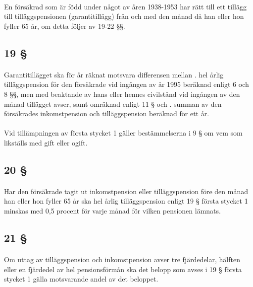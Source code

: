\documentclass[a4paper,notitlepage,openany,10pt]{book}
\begin{document}
\paragraph*{}
En försäkrad som är född under något av åren 1938-1953 har rätt till ett tillägg till tilläggspensionen (garantitillägg) från och med den månad då han eller hon fyller 65 år, om detta följer av 19-22 §§.
\subsection*{19 §}
\paragraph*{}
Garantitillägget ska för år räknat motsvara differensen mellan
. hel årlig tilläggspension för den försäkrade vid ingången av år 1995 beräknad enligt 6 och 8 §§, men med beaktande av hans eller hennes civilstånd vid ingången av den månad tillägget avser, samt omräknad enligt 11 § och
. summan av den försäkrades inkomstpension och tilläggspension beräknad för ett år.
\paragraph*{}
Vid tillämpningen av första stycket 1 gäller bestämmelserna i 9 § om vem som likställs med gift eller ogift.
\subsection*{20 §}
\paragraph*{}
Har den försäkrade tagit ut inkomstpension eller tilläggspension före den månad han eller hon fyller 65 år ska hel årlig tilläggspension enligt 19 § första stycket 1 minskas med 0,5 procent för varje månad för vilken pensionen lämnats.
\subsection*{21 §}
\paragraph*{}
Om uttag av tilläggspension och inkomstpension avser tre fjärdedelar, hälften eller en fjärdedel av hel pensionsförmån ska det belopp som avses i 19 § första stycket 1 gälla motsvarande andel av det beloppet.
\end{document}
